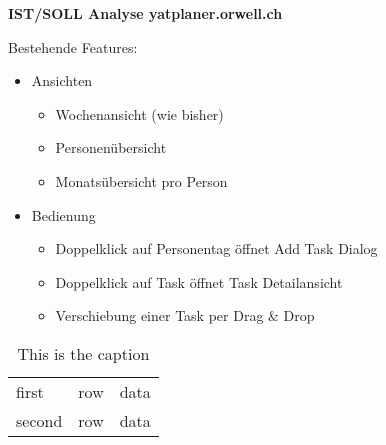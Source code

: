 {\textbf{IST/SOLL Analyse yatplaner.orwell.ch}}

Bestehende Features:
\begin{itemize}
    \item Ansichten
    \begin{itemize}
        \item Wochenansicht (wie bisher)
        \item Personenübersicht
        \item Monatsübersicht pro Person
    \end{itemize}
    \item Bedienung
    \begin{itemize}
        \item Doppelklick auf Personentag öffnet Add Task Dialog
        \item Doppelklick auf Task öffnet Task Detailansicht
        \item Verschiebung einer Task per Drag \& Drop
    \end{itemize}
\end{itemize}

\begin{table}[!th]
\begin{tabular}{|l|c|r|}
\hline
first  &  row  &  data \\
second &  row  &  data \\
\hline
\end{tabular}
\caption{This is the caption}
\end{table}

